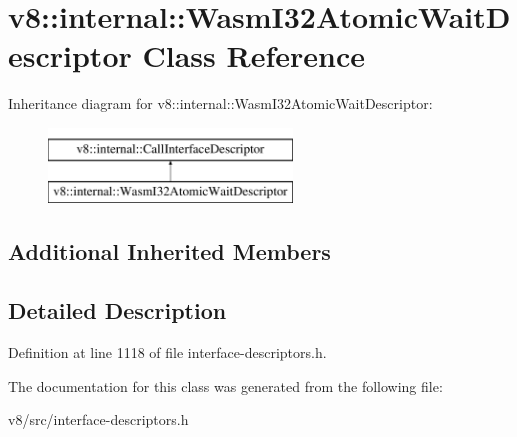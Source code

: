 \hypertarget{classv8_1_1internal_1_1WasmI32AtomicWaitDescriptor}{}\section{v8\+:\+:internal\+:\+:Wasm\+I32\+Atomic\+Wait\+Descriptor Class Reference}
\label{classv8_1_1internal_1_1WasmI32AtomicWaitDescriptor}
Inheritance diagram for v8\+:\+:internal\+:\+:Wasm\+I32\+Atomic\+Wait\+Descriptor\+:\begin{figure}[H]
\begin{center}
\leavevmode
\includegraphics[height=2.000000cm]{classv8_1_1internal_1_1WasmI32AtomicWaitDescriptor}
\end{center}
\end{figure}
\subsection*{Additional Inherited Members}


\subsection{Detailed Description}


Definition at line 1118 of file interface-\/descriptors.\+h.



The documentation for this class was generated from the following file\+:\begin{DoxyCompactItemize}
\item 
v8/src/interface-\/descriptors.\+h\end{DoxyCompactItemize}
